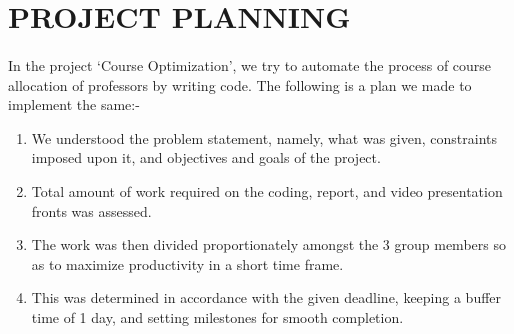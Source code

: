 \section{PROJECT PLANNING}
\paragraph{}  In the project `Course Optimization', we try to automate the process of course allocation of professors by writing code. The following is a plan we made to implement the same:-
\begin{enumerate}
\item We understood the problem statement, namely, what was given, constraints imposed upon it, and objectives and goals of the project.
\item Total amount of work required on the coding, report, and video presentation fronts was assessed.
\item The work was then divided proportionately amongst the 3 group members so as to maximize productivity in a short time frame.
\item This was determined in accordance with the given deadline, keeping a buffer time of 1 day, and setting milestones for smooth completion.
\end{enumerate}